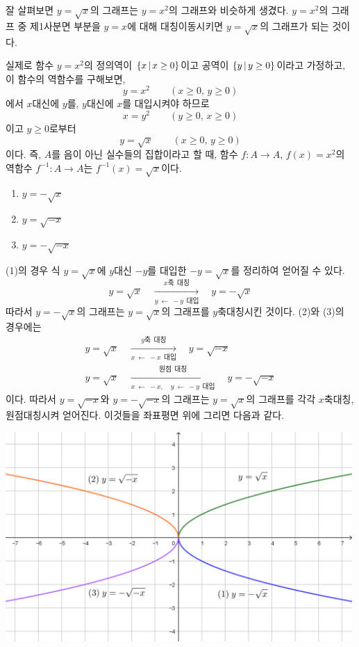 \documentclass{oblivoir}
\begin{document}
\bigskip
잘 살펴보면 \(y=\sqrt x\)의 그래프는 \(y=x^2\)의 그래프와 비슷하게 생겼다.
\(y=x^2\)의 그래프 중 제1사분면 부분을 \(y=x\)에 대해 대칭이동시키면 \(y=\sqrt x\)의 그래프가 되는 것이다.

실제로 함수 \(y=x^2\)의 정의역이 \(\{x\,|\, x\ge0\}\)이고 공역이 \(\{y\,|\, y\ge 0\}\)이라고 가정하고, 이 함수의 역함수를 구해보면,
\[y=x^2\qquad(x\ge0,\,y\ge0)\]
에서 \(x\)대신에 \(y\)를, \(y\)대신에 \(x\)를 대입시켜야 하므로
\[x=y^2\qquad(y\ge0,\,x\ge0)\]
이고 \(y\ge0\)로부터
\[y=\sqrt x\qquad(x\ge0,\,y\ge0)\]
이다.
즉, \(A\)를 음이 아닌 실수들의 집합이라고 할 때, %
함수 \(f:A\to A\), \(f(x)=x^2\)의 역함수 \(f^{-1}:A\to A\)는 \(f^{-1}(x)=\sqrt x\)이다.

\newpage
%
\begin{enumerate}\label{irrational2}
\item
\(y=-\sqrt x\)
\item
\(y=\sqrt{-x}\)
\item
\(y=-\sqrt{-x}\)
\end{enumerate}
\begin{mdframed}
(1)의 경우 식 \(y=\sqrt x\)에 \(y\)대신 \(-y\)를 대입한 \(-y=\sqrt x\)를 정리하여 얻어질 수 있다.
\[y=\sqrt x
\quad\xrightarrow[y\:\leftarrow\: -y\:\:대입]{x축\:\:대칭}\quad
y=-\sqrt x\]
따라서 \(y=-\sqrt x\)의 그래프는 \(y=\sqrt x\)의 그래프를 \(y\)축대칭시킨 것이다.
(2)와 (3)의 경우에는
\begin{gather*}
y=\sqrt x
\quad\xrightarrow[x\:\leftarrow\: -x\:\:대입]{y축\:\:대칭}\quad
y=\sqrt{-x}
\\[10pt]
y=\sqrt x
\quad\xrightarrow[x\:\leftarrow\: -x,\quad y\:\leftarrow\: -y\:\:대입]{원점\:\:대칭}\quad
y=-\sqrt{-x}
\end{gather*}
이다.
따라서 \(y=\sqrt{-x}\)와 \(y=-\sqrt{-x}\)의 그래프는 \(y=\sqrt x\)의 그래프를 각각 \(x\)축대칭, 원점대칭시켜 얻어진다.
이것들을 좌표평면 위에 그리면 다음과 같다.
\begin{center}
\includegraphics[width=0.99\textwidth]{irrational_2}
\end{center}
\end{mdframed}
\end{document}
